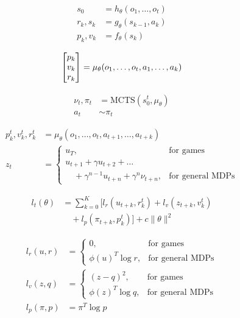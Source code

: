 \begin{align}
    s_0      & = h_\theta(o_1, \ldots, o_t) \\
    r_k, s_k & = g_\theta(s_{k-1}, a_k)     \\
    p_k, v_k & = f_\theta(s_k)
\end{align}

\begin{equation}
    \setlength{\arraycolsep}{1.5pt} %
    \begin{bmatrix}
        p_k \\ v_k \\ r_k
    \end{bmatrix}
    =
    \mu_\theta(o_1, \ldots, o_t, a_1, \ldots, a_k)
    \label{eq:matrix}
\end{equation}

\begin{align}
    \nu_t, \pi_t & = \text{MCTS}(s_0^t, \mu_\theta) \\
    a_t          & \sim \pi_t
\end{align}

\begin{align}
    p_k^t, v_k^t, r_k^t & = \mu_\theta(o_1, \ldots, o_t, a_{t+1}, \ldots, a_{t+k}) \\
    z_t                 & =
    \begin{cases}
        u_T,                                               & \text{for games}        \\
        u_{t+1} + \gamma u_{t+2} + \ldots \nonumber                                  \\
        \quad + \gamma^{n-1} u_{t+n} + \gamma^n \nu_{t+n}, & \text{for general MDPs}
    \end{cases}
\end{align}

\begin{align}
    l_t(\theta) & =
    \sum_{k=0}^K \big[ l_r(u_{t+k}, r_k^t) + l_v(z_{t+k}, v_k^t) \nonumber \\
                & \quad + l_p(\pi_{t+k}, p_k^t) \big] + c \|\theta\|^2
\end{align}

\begin{align}
    l_r(u, r)   & =
    \begin{cases}
        0,                & \text{for games}        \\
        \phi(u)^T \log r, & \text{for general MDPs}
    \end{cases} \\
    l_v(z, q)   & =
    \begin{cases}
        (z - q)^2,        & \text{for games}        \\
        \phi(z)^T \log q, & \text{for general MDPs}
    \end{cases} \\
    l_p(\pi, p) & = \pi^T \log p
\end{align}

